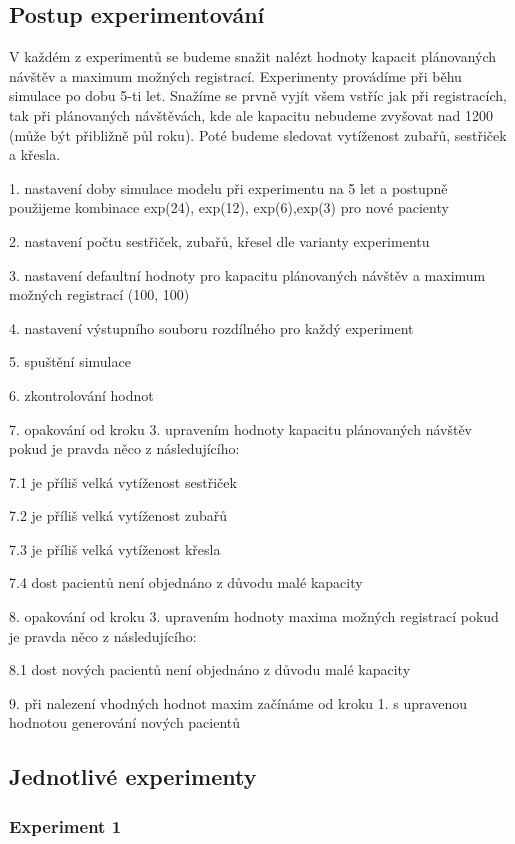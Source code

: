 \documentclass[a4paper,11pt,titlepage]{article}
\begin{document}
\subsection{Postup experimentování}

V každém z experimentů se budeme snažit nalézt hodnoty kapacit plánovaných návštěv a maximum možných registrací. Experimenty provádíme při běhu simulace po dobu 5-ti let. Snažíme se prvně vyjít všem vstříc jak při registracích, tak při plánovaných návštěvách, kde ale kapacitu nebudeme zvyšovat nad 1200 (může být přibližně půl roku). Poté budeme sledovat vytíženost zubařů, sestřiček a křesla. \newline

 1. nastavení doby simulace modelu při experimentu na 5 let a postupně použijeme kombinace exp(24), exp(12), exp(6),exp(3) pro nové pacienty

 2. nastavení počtu sestřiček, zubařů, křesel dle varianty experimentu

 3. nastavení defaultní hodnoty pro kapacitu plánovaných návštěv a maximum možných registrací (100, 100)

 4. nastavení výstupního souboru rozdílného pro každý experiment

 5. spuštění simulace

 6. zkontrolování hodnot 

 7. opakování od kroku 3. upravením hodnoty kapacitu plánovaných návštěv pokud je pravda něco z následujícího:

	7.1 je příliš velká vytíženost sestřiček

	7.2 je příliš velká vytíženost zubařů

	7.3 je příliš velká vytíženost křesla

	7.4 dost pacientů není objednáno z důvodu malé kapacity

 8. opakování od kroku 3. upravením hodnoty maxima možných registrací pokud je pravda něco z následujícího:

	8.1 dost nových pacientů není objednáno z důvodu malé kapacity

 9. při nalezení vhodných hodnot maxim začínáme od kroku 1. s upravenou hodnotou generování nových pacientů

\newpage

\subsection{Jednotlivé experimenty}
\subsubsection{Experiment 1}
\end{document}
